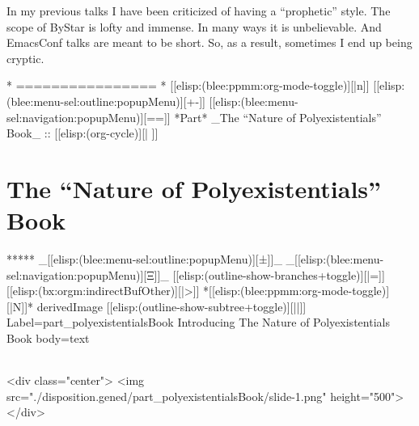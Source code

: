\begin{whenOrg}
{  In my previous talks I have been criticized of having a ``prophetic'' style.
  The scope of ByStar is lofty and immense. In many ways it is unbelievable.
  And EmacsConf talks are meant to be short. So, as a result, sometimes I end up being cryptic.
}




\begin{whenOrg}
*      ================
*  [[elisp:(blee:ppmm:org-mode-toggle)][|n]] [[elisp:(blee:menu-sel:outline:popupMenu)][+-]] [[elisp:(blee:menu-sel:navigation:popupMenu)][==]]  *Part*   _The ``Nature of Polyexistentials'' Book_ ::  [[elisp:(org-cycle)][| ]]
\end{whenOrg}

\newpage
\part{The ``Nature of Polyexistentials'' Book}

\begin{whenOrg}
*****  _[[elisp:(blee:menu-sel:outline:popupMenu)][±]]_ _[[elisp:(blee:menu-sel:navigation:popupMenu)][Ξ]]_ [[elisp:(outline-show-branches+toggle)][|=]] [[elisp:(bx:orgm:indirectBufOther)][|>]] *[[elisp:(blee:ppmm:org-mode-toggle)][|N]]*  derivedImage [[elisp:(outline-show-subtree+toggle)][||]] Label=part_polyexistentialsBook Introducing The Nature of Polyexistentials Book body=text
\end{whenOrg}

\begin{htmlonly}

\begin{frame}[fragile,plain,label=part_polyexistentialsBook]
    \frametitle{}
    \framesubtitle{}
    \begin{rawhtml}
<div class="center">
<img src="./disposition.gened/part_polyexistentialsBook/slide-1.png" height="500">
</div>
    \end{rawhtml}
\end{frame}
\end{htmlonly}

\begin{verblatex}


\end{verblatex}
\end{whenOrg}
